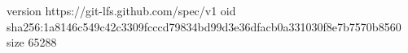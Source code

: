 version https://git-lfs.github.com/spec/v1
oid sha256:1a8146c549c42c3309fcccd79834bd99d3e36dfacb0a331030f8e7b7570b8560
size 65288
